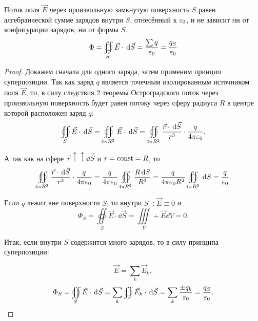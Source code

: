     \begin{theorem}[Гаусс]
        Поток поля \( \vec{E} \) через произвольную замкнутую поверхность
        \( S \) равен алгебраической сумме зарядов внутри \( S \), отнесённый к 
        \( \varepsilon_0 \), и не зависит ни от конфигурации зарядов, ни от формы
        \( S \).
        \begin{equation}
            \label{eq:thegauss}
            \Phi = \oiint\limits_S \vec{E}\cdot\,\mathrm{d}\vec{S} = 
            \frac{\sum{q}}{\varepsilon_0} = \frac{q_{S}}{\varepsilon_0}
        \end{equation}
    \end{theorem}


    \begin{proof}
        Докажем сначала для одного заряда, затем применим принцип суперпозиции. 
        Так как заряд \( q \) является точечным изолированным источником поля 
        \( \vec{E} \), то, в силу следствия 2 теоремы Остроградского поток 
        через произвольную поверхность будет равен потоку через сферу радиуса 
        \( R \) в центре которой расположен заряд \( q \):
        \[
            \oiint\limits_S \vec{E}\cdot\,\mathrm{d}\vec{S} = 
            \oiint\limits_{4\pi R^{2}} \vec{E}\cdot\,\mathrm{d}\vec{S} = 
            \oiint\limits_{4\pi R^{2}}\frac{\vec{r}\cdot\,\mathrm{d}\vec{S}}{r^3}
            \cdot\frac{q}{4\pi\varepsilon_0}.
        \]

        А так как на сфере \( \vec{r} \uparrow\uparrow \dd\vec{S} \) и
        \( r = \mathrm{const} = R\), то
        \[
            \oiint\limits_{4\pi R^{2}}
            \frac{\vec{r}\cdot\,\mathrm{d}\vec{S}}{r^3}\cdot\frac{q}{4\pi\varepsilon_0} = 
            \frac{q}{4\pi\varepsilon_0}\oiint\limits_{4\pi R^2} \frac{R\,\mathrm{d} S}{R^3} = 
            \frac{q}{4\pi\varepsilon_0 R^2}\oiint\limits_{4\pi R^2}\,\mathrm{d} S = 
            \frac{q}{\varepsilon_0}.
        \]

        Если \( q \) лежит вне поверхности \( S \), то внутри \( S \)
        \( \div\vec{E} \equiv 0 \) и
        \[
            \Phi_{S} = \oiint\limits_S \vec{E}\cdot\dd\vec{S} = 
            \iiint\limits_V \div\vec{E}\dd V = 0.
        \]

        Итак, если внутри \( S \) содержится много зарядов, то в силу принципа 
        суперпозиции:

        \[
            \vec{E}=\sum\limits_k \vec{E}_{k},
        \]
        \[
            \Phi_{S} = \oiint\limits_S \vec{E}\cdot\,\mathrm{d}\vec{S} =
            \sum\limits_k\oiint \vec{E}_{k}\cdot\,\mathrm{d} \vec{S} =
            \sum\limits_k \frac{\pm q_{k}}{\varepsilon_0} = \frac{q_{S}}{\varepsilon_0}.
        \]

    \end{proof}

